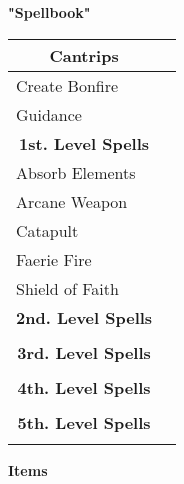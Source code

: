 \documentclass[11pt]{article}
\newcommand{\done}{\rlap{$\square$}{\raisebox{2pt}{\large\hspace{1pt}\ding{51}}}}
\begin{document}
\clearpage

	\begin{center}
{\LARGE \textbf{"Spellbook"}}
	\end{center}

	\begin{tabularx}{\textwidth}{X|r}
\multicolumn{1}{c|}{\large \textbf{Cantrips}} 	& 	\\
\hline
Create Bonfire 									& 	\\
Guidance 										& 	\\

\multicolumn{1}{c|}{\large \textbf{1st. Level Spells}} & \\
\hline
Absorb Elements	 								& \done \\
Arcane Weapon									& \done \\
Catapult										& \done \\
Faerie Fire 									& \done \\
Shield of Faith		 							& \done \\

\multicolumn{1}{c|}{\large \textbf{2nd. Level Spells}} &	\\
\hline
												&	\\

\multicolumn{1}{c|}{\large \textbf{3rd. Level Spells}} & \\
\hline
 												&  	\\

\multicolumn{1}{c|}{\large \textbf{4th. Level Spells}} & \\
\hline
 												&  	\\

\multicolumn{1}{c|}{\large \textbf{5th. Level Spells}} & \\
\hline
	 											&
	\end{tabularx}

\clearpage

	\begin{center}
{\LARGE \textbf{Items}}
	\end{center}
\end{document}
